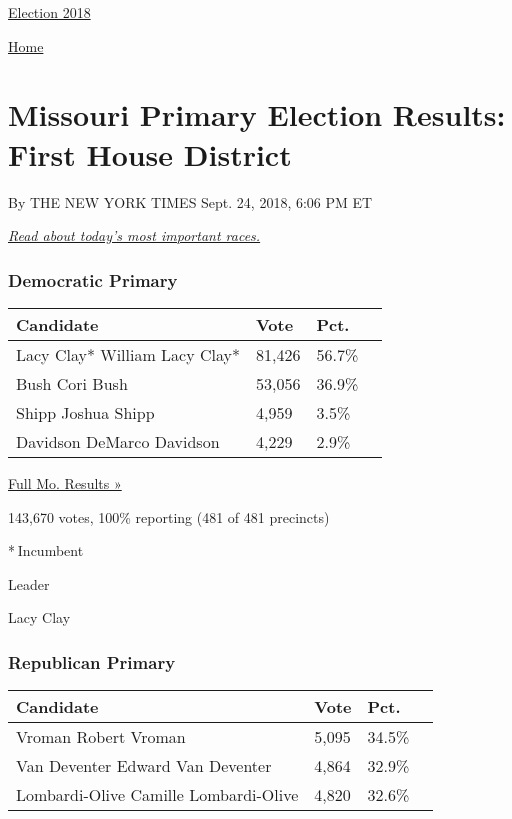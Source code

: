 \href{//www.nytimes.com}{}\href{https://www.nytimes.com/interactive/2018/us/elections/calendar-primary-results.html}{
Election 2018}

\href{//www.nytimes.com}{ Home}

\hypertarget{missouri-primary-election-results-first-house-district}{%
\section{Missouri Primary Election Results: First House
District}\label{missouri-primary-election-results-first-house-district}}

By THE NEW YORK TIMES Sept. 24, 2018, 6:06 PM ET

\href{https://www.nytimes.com/2018/08/07/us/politics/primary-election-today.html}{\emph{Read
about today's most important races.}}

\hypertarget{democratic-primary}{%
\subsubsection{Democratic Primary}\label{democratic-primary}}

\begin{longtable}[]{@{}llll@{}}
\toprule
Candidate & Vote & Pct. &\tabularnewline
\midrule
\endhead
 Lacy Clay* William Lacy Clay* & 81,426 & 56.7\% &\tabularnewline
 Bush Cori Bush & 53,056 & 36.9\% &\tabularnewline
 Shipp Joshua Shipp & 4,959 & 3.5\% &\tabularnewline
 Davidson DeMarco Davidson & 4,229 & 2.9\% &\tabularnewline
\bottomrule
\end{longtable}

\href{https://www.nytimes.com/elections/results/missouri}{Full Mo.
Results »}

143,670 votes, 100\% reporting (481 of 481 precincts)

* Incumbent

Leader

 Lacy Clay

\hypertarget{republican-primary}{%
\subsubsection{Republican Primary}\label{republican-primary}}

\begin{longtable}[]{@{}llll@{}}
\toprule
Candidate & Vote & Pct. &\tabularnewline
\midrule
\endhead
 Vroman Robert Vroman & 5,095 & 34.5\% &\tabularnewline
 Van Deventer Edward Van Deventer & 4,864 & 32.9\% &\tabularnewline
 Lombardi-Olive Camille Lombardi-Olive & 4,820 & 32.6\% &\tabularnewline
\bottomrule
\end{longtable}

